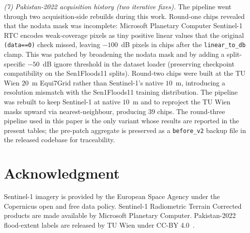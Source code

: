 \documentclass[conference]{IEEEtran}
\begin{document}
\textit{(7) Pakistan-2022 acquisition history (two iterative fixes).} The pipeline went through two acquisition-side rebuilds during this work. Round-one chips revealed that the nodata mask was incomplete: Microsoft Planetary Computer Sentinel-1 RTC encodes weak-coverage pixels as tiny positive linear values that the original \texttt{(data==0)} check missed, leaving $-100$~dB pixels in chips after the \texttt{linear\_to\_db} clamp. This was patched by broadening the nodata mask and by adding a split-specific $-50$~dB ignore threshold in the dataset loader (preserving checkpoint compatibility on the Sen1Floods11 splits). Round-two chips were built at the TU Wien $20$~m Equi7Grid rather than Sentinel-1's native $10$~m, introducing a resolution mismatch with the Sen1Floods11 training distribution. The pipeline was rebuilt to keep Sentinel-1 at native $10$~m and to reproject the TU Wien masks upward via nearest-neighbour, producing $39$ chips. The round-three pipeline used in this paper is the only variant whose results are reported in the present tables; the pre-patch aggregate is preserved as a \texttt{before\_v2} backup file in the released codebase for traceability.

\section*{Acknowledgment}

Sentinel-1 imagery is provided by the European Space Agency under the Copernicus open and free data policy. Sentinel-1 Radiometric Terrain Corrected products are made available by Microsoft Planetary Computer. Pakistan-2022 flood-extent labels are released by TU Wien under CC-BY 4.0~\cite{Roth2023Pakistan}.
\end{document}
